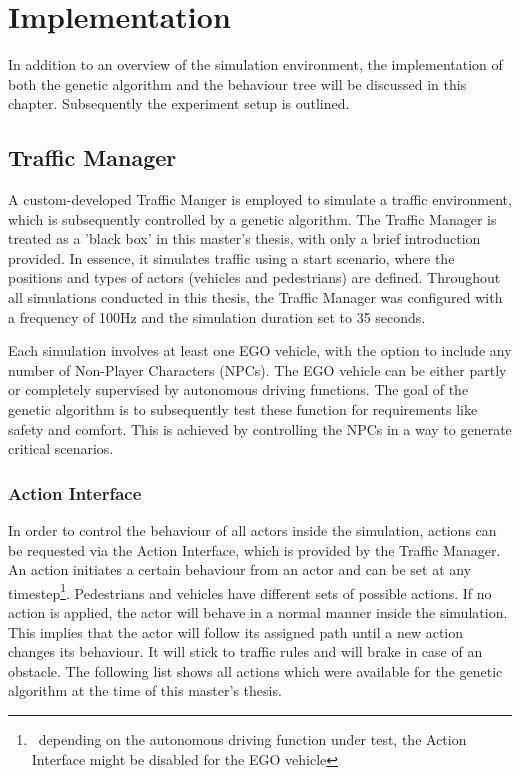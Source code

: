 \chapter{Implementation}
\label{chap:implementation}
In addition to an overview of the simulation environment, the implementation of both the genetic algorithm and the behaviour tree will be discussed in this chapter. Subsequently the experiment setup is outlined.

\section{Traffic Manager}
A custom-developed Traffic Manger is employed to simulate a traffic environment, which is subsequently controlled by a genetic algorithm. The Traffic Manager is treated as a 'black box' in this master's thesis, with only a brief introduction provided. In essence, it simulates traffic using a start scenario, where the positions and types of actors (vehicles and pedestrians) are defined. Throughout all simulations conducted in this thesis, the Traffic Manager was configured with a frequency of 100Hz and the simulation duration set to 35 seconds.

Each simulation involves at least one EGO vehicle, with the option to include any number of Non-Player Characters (NPCs). The EGO vehicle can be either partly or completely supervised by autonomous driving functions. The goal of the genetic algorithm is to subsequently test these function for requirements like safety and comfort. This is achieved by controlling the NPCs in a way to generate critical scenarios.

\subsection{Action Interface}
\label{sect:implementation:action_interface}
In order to control the behaviour of all actors inside the simulation, actions can be requested via the Action Interface, which is provided by the Traffic Manager. An action initiates a certain behaviour from an actor and can be set at any timestep\footnote{~depending on the autonomous driving function under test, the Action Interface might be disabled for the EGO vehicle}. Pedestrians and vehicles have different sets of possible actions. If no action is applied, the actor will behave in a normal manner inside the simulation. This implies that the actor will follow its assigned path until a new action changes its behaviour. It will stick to traffic rules and will brake in case of an obstacle. The following list shows all actions which were available for the genetic algorithm at the time of this master's thesis.

